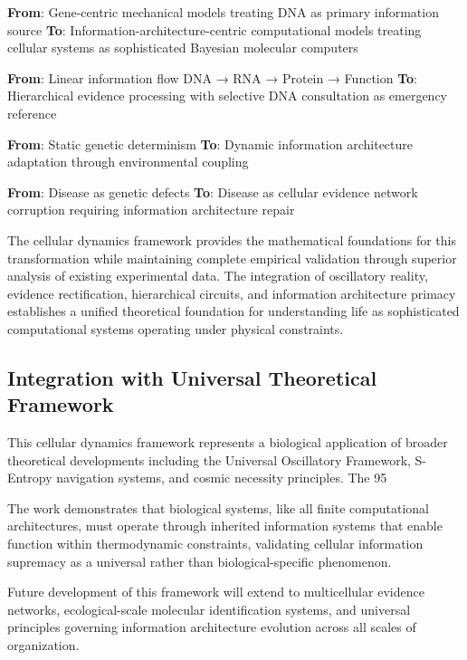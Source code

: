 \documentclass[12pt,a4paper]{article}
\begin{document}
\textbf{From}: Gene-centric mechanical models treating DNA as primary information source
\textbf{To}: Information-architecture-centric computational models treating cellular systems as sophisticated Bayesian molecular computers

\textbf{From}: Linear information flow DNA → RNA → Protein → Function  
\textbf{To}: Hierarchical evidence processing with selective DNA consultation as emergency reference

\textbf{From}: Static genetic determinism  
\textbf{To}: Dynamic information architecture adaptation through environmental coupling

\textbf{From}: Disease as genetic defects  
\textbf{To}: Disease as cellular evidence network corruption requiring information architecture repair

The cellular dynamics framework provides the mathematical foundations for this transformation while maintaining complete empirical validation through superior analysis of existing experimental data. The integration of oscillatory reality, evidence rectification, hierarchical circuits, and information architecture primacy establishes a unified theoretical foundation for understanding life as sophisticated computational systems operating under physical constraints.

\subsection{Integration with Universal Theoretical Framework}

This cellular dynamics framework represents a biological application of broader theoretical developments including the Universal Oscillatory Framework, S-Entropy navigation systems, and cosmic necessity principles. The 95%

The work demonstrates that biological systems, like all finite computational architectures, must operate through inherited information systems that enable function within thermodynamic constraints, validating cellular information supremacy as a universal rather than biological-specific phenomenon.

Future development of this framework will extend to multicellular evidence networks, ecological-scale molecular identification systems, and universal principles governing information architecture evolution across all scales of organization.
\end{document}
